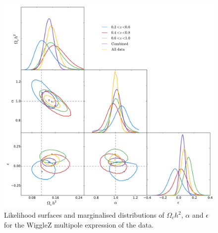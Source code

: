 \documentclass[titlesmallcaps, examinerscopy, copyrightpage]{uqthesis}
\begin{document}
\begin{figure}[h!]
  \begin{center}
    \includegraphics[width=\textwidth]{images/corCombinedMPWig.pdf}
  \end{center}
  \caption{Likelihood surfaces and marginalised distributions of $\Omega_ch^2$, $\alpha$ and $\epsilon$ for the WiggleZ multipole expression of the data. }
  \label{fig:wigglezBinsMP}
\end{figure}
\end{document}
